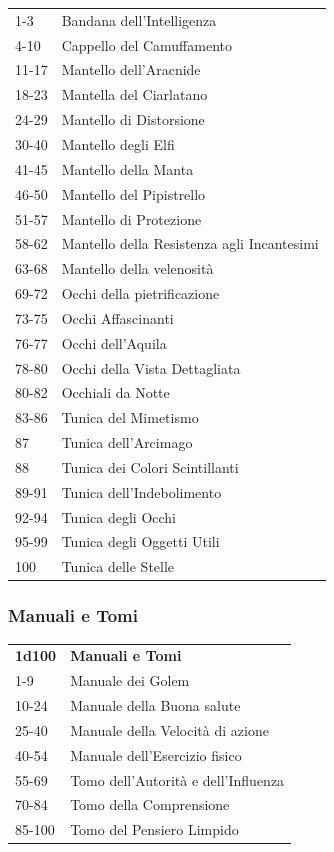 \begin{multicols}{2}
\begin{tabularx}{0.45\textwidth}{lX}
1-3 &Bandana dell'Intelligenza\\
4-10 &Cappello del Camuffamento\\
11-17& Mantello dell'Aracnide\\
18-23& Mantella del Ciarlatano\\
24-29& Mantello di Distorsione\\
30-40& Mantello degli Elfi\\
41-45& Mantello della Manta\\
46-50& Mantello del Pipistrello\\
51-57& Mantello di Protezione\\
58-62& Mantello della Resistenza agli Incantesimi\\
63-68& Mantello della velenosità\\
69-72& Occhi della pietrificazione\\
73-75& Occhi Affascinanti\\
76-77& Occhi dell'Aquila\\
78-80& Occhi della Vista Dettagliata\\
80-82& Occhiali da Notte\\
83-86 &Tunica del Mimetismo\\
87 &Tunica dell’Arcimago\\
88 &Tunica dei Colori Scintillanti\\
89-91& Tunica dell’Indebolimento\\
92-94 &Tunica degli Occhi\\
95-99 &Tunica degli Oggetti Utili\\
100 &Tunica delle Stelle\\
\end{tabularx}


\subsubsection{Manuali e Tomi}

\begin{tabularx}{0.45\textwidth}{lX}
\textbf{1d100} & \textbf{Manuali e Tomi}\\
1-9 & Manuale dei Golem\\
10-24 & Manuale della Buona salute\\
25-40 &Manuale della Velocità di azione\\
40-54 &Manuale dell'Esercizio fisico\\
55-69 &Tomo dell'Autorità e dell'Influenza\\
70-84 &Tomo della Comprensione\\
85-100& Tomo del Pensiero Limpido\\
\end{tabularx}


\end{multicols}
